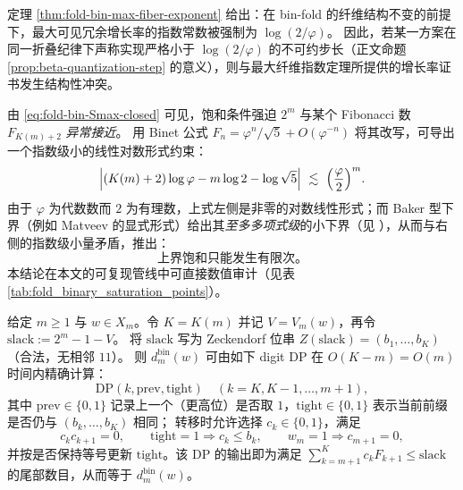 \begin{remark}[不可约步长常数的硬约束]\label{rem:fold-bin-delta-min-hard-constraint}
定理 \ref{thm:fold-bin-max-fiber-exponent} 给出：在 bin-fold 的纤维结构不变的前提下，最大可见冗余增长率的指数常数被强制为 \(\log(2/\varphi)\)。
因此，若某一方案在同一折叠纪律下声称实现严格小于 \(\log(2/\varphi)\) 的不可约步长（正文命题 \ref{prop:beta-quantization-step} 的意义），则与最大纤维指数定理所提供的增长率证书发生结构性冲突。
\end{remark}

\begin{remark}\label{rem:fold-bin-finite}
由 \eqref{eq:fold-bin-Smax-closed} 可见，饱和条件强迫 \(2^m\) 与某个 Fibonacci 数 \(F_{K(m)+2}\) \emph{异常接近}。
用 Binet 公式 \(F_n=\varphi^n/\sqrt5+O(\varphi^{-n})\) 将其改写，可导出一个指数级小的线性对数形式约束：
\[
\Bigl|(K(m)+2)\log\varphi - m\log 2 - \log\sqrt5\Bigr|
\ \lesssim\ \Bigl(\frac{\varphi}{2}\Bigr)^m.
\]
由于 \(\varphi\) 为代数数而 \(2\) 为有理数，上式左侧是非零的对数线性形式；而 Baker 型下界（例如 Matveev 的显式形式）给出其\emph{至多多项式级}的小下界（见 \cite{Matveev2000LinearFormsLogs,BakerWustholz2007LogarithmicForms}），从而与右侧的指数级小量矛盾，推出：
\[
\text{上界饱和只能发生有限次。}
\]
本结论在本文的可复现管线中可直接数值审计（见表 \ref{tab:fold_binary_saturation_points}）。
\end{remark}

\begin{proposition}\label{prop:fold-bin-digit-dp}
给定 \(m\ge 1\) 与 \(w\in X_m\)。令 \(K=K(m)\) 并记 \(V=V_m(w)\)，再令 \(\mathrm{slack}:=2^m-1-V\)。
将 \(\mathrm{slack}\) 写为 Zeckendorf 位串 \(Z(\mathrm{slack})=(b_1,\dots,b_K)\)（合法，无相邻 \(11\)）。
则 \(d^{\mathrm{bin}}_m(w)\) 可由如下 digit DP 在 \(O(K-m)=O(m)\) 时间内精确计算：
\[
\mathrm{DP}(k,\mathrm{prev},\mathrm{tight})
\quad(k=K,K-1,\dots,m+1),
\]
其中 \(\mathrm{prev}\in\{0,1\}\) 记录上一个（更高位）是否取 \(1\)，\(\mathrm{tight}\in\{0,1\}\) 表示当前前缀是否仍与 \((b_k,\dots,b_K)\) 相同；
转移时允许选择 \(c_k\in\{0,1\}\)，满足
\[
c_k c_{k+1}=0,\qquad
\mathrm{tight}=1\Rightarrow c_k\le b_k,\qquad
w_m=1\Rightarrow c_{m+1}=0,
\]
并按是否保持等号更新 \(\mathrm{tight}\)。该 DP 的输出即为满足 \(\sum_{k=m+1}^K c_k F_{k+1}\le \mathrm{slack}\) 的尾部数目，从而等于 \(d^{\mathrm{bin}}_m(w)\)。
\end{proposition}



